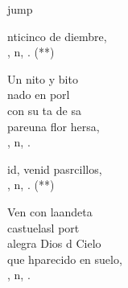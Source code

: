 \begin{cancion}jump\\
	\begin{chorus}%
		nticinco de diembre,\\
		, n, . (**)\jump\\
	\end{chorus}%
	Un nito y bito \\
	 nado en  porl\\
	con su ta de sa\\
	pareuna flor hersa,\\
	, n, .\jump\\
	\begin{chorus}%
		id, venid pasrcillos,\\
		, n, . (**)\jump\\
	\end{chorus}%
	Ven con laandeta\\
	castuelasl port \\
	alegra Dios d Cielo\\
	que hparecido en  suelo,\\
	, n, .\\
\end{cancion}%
